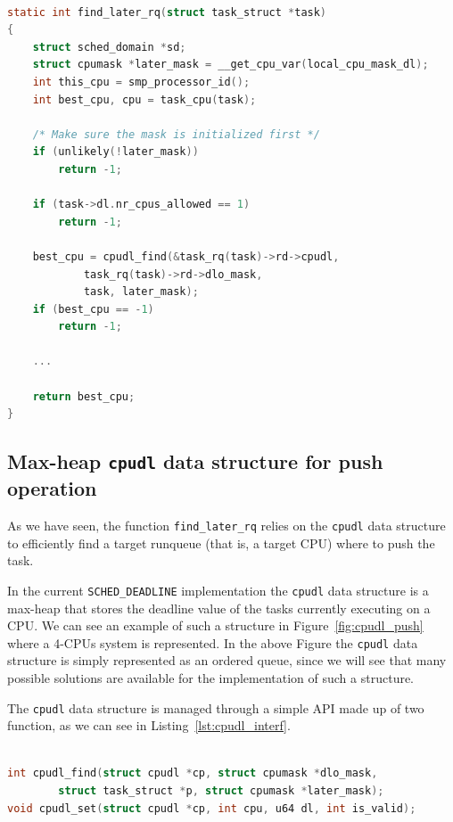 \begin{lstlisting}[language=C, caption={\texttt{find\_later\_rq} function},
				label={lst:find_later_rq}]

static int find_later_rq(struct task_struct *task)
{
	struct sched_domain *sd;
	struct cpumask *later_mask = __get_cpu_var(local_cpu_mask_dl);
	int this_cpu = smp_processor_id();
	int best_cpu, cpu = task_cpu(task);

	/* Make sure the mask is initialized first */
	if (unlikely(!later_mask))
		return -1;

	if (task->dl.nr_cpus_allowed == 1)
		return -1;

	best_cpu = cpudl_find(&task_rq(task)->rd->cpudl,
			task_rq(task)->rd->dlo_mask,
			task, later_mask);
	if (best_cpu == -1)
		return -1;

	...

	return best_cpu;
}

\end{lstlisting}

\subsection{Max-heap \texttt{cpudl} data structure for push operation\label{sec:max_heap_cpudl}}

As we have seen, the function \texttt{find\_later\_rq} relies on the
\texttt{cpudl} data structure to efficiently find a target runqueue
(that is, a target CPU) where to push the task.

In the current \texttt{SCHED\_DEADLINE} implementation the
\texttt{cpudl} data structure is a max-heap that stores the deadline
value of the tasks currently executing on a CPU. We can see an example
of such a structure in Figure~\vref{fig:cpudl_push} where a 4-CPUs
system is represented.  In the above Figure the \texttt{cpudl} data
structure is simply represented as an ordered queue, since we will see
that many possible solutions are available for the implementation of
such a structure.

The \texttt{cpudl} data structure is managed through a simple API made
up of two function, as we can see in Listing~\ref{lst:cpudl_interf}.

\begin{lstlisting}[language=C, caption={\texttt{cpudl} API},
				label={lst:cpudl_interf}]

int cpudl_find(struct cpudl *cp, struct cpumask *dlo_mask,
		struct task_struct *p, struct cpumask *later_mask);
void cpudl_set(struct cpudl *cp, int cpu, u64 dl, int is_valid);

\end{lstlisting}

